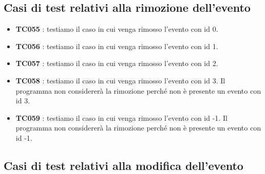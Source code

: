 \documentclass[11pt]{scrartcl} %
\begin{document}
\subsection{Casi di test relativi alla rimozione dell'evento}

\begin{itemize}

	\item \textbf{TC055} : testiamo il caso in cui venga rimosso l'evento con id 0.

	\item \textbf{TC056} : testiamo il caso in cui venga rimosso l'evento con id 1.

	\item \textbf{TC057} : testiamo il caso in cui venga rimosso l'evento con id 2.

	\item \textbf{TC058} : testiamo il caso in cui venga rimosso l'evento con id 3. Il programma non considererà la rimozione perché non è presente un evento con id 3.

	\item \textbf{TC059} : testiamo il caso in cui venga rimosso l'evento con id -1. Il programma non considererà la rimozione perché non è presente un evento con id -1.

\end{itemize}

\subsection{Casi di test relativi alla modifica dell'evento}
\end{document}
